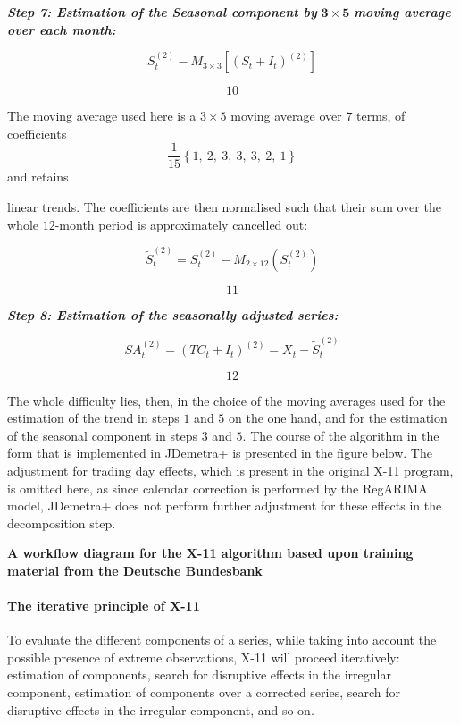 \documentclass[
  letterpaper,
  DIV=11,
  numbers=noendperiod]{scrreprt}
\let\oldparagraph\paragraph
\renewcommand{\paragraph}[1]{\oldparagraph{#1}\mbox{}}
\begin{document}
\textbf{\emph{Step 7: Estimation of the Seasonal component by}}
\(\mathbf{3 \times 5}\) \textbf{\emph{moving average over each month:}}

\[S_{t}^{(2)} - M_{3 \times 3}\left\lbrack \left( S_{t} + I_{t} \right)^{(2)} \right\rbrack\]

\[10\]

The moving average used here is a \(3 \times 5\) moving average over
\(7\) terms, of coefficients
\[\frac{1}{15} \left\{ 1,\ 2,\ 3,\ 3,\ 3,\ 2,\ 1 \right\}\] and retains

linear trends. The coefficients are then normalised such that their sum
over the whole \(12\)-month period is approximately cancelled out:

\[{ \widetilde{S}}_{t}^{(2)} = S_{t}^{(2)} - M_{2 \times 12}\left( S_{t}^{(2)} \right)\]

\[11\]

\textbf{\emph{Step 8: Estimation of the seasonally adjusted series:}}

\[SA_{t}^{\left( 2 \right)} = \left(TC_{t} + I_{t} \right)^{(2)} = X_{t} - {\widetilde{S}}_{t}^{(2)}\]

\[12\]

The whole difficulty lies, then, in the choice of the moving averages
used for the estimation of the trend in steps \(1\) and \(5\) on the one
hand, and for the estimation of the seasonal component in steps \(3\)
and \(5\). The course of the algorithm in the form that is implemented
in JDemetra+ is presented in the figure below. The adjustment for
trading day effects, which is present in the original X-11 program, is
omitted here, as since calendar correction is performed by the RegARIMA
model, JDemetra+ does not perform further adjustment for these effects
in the decomposition step.

\textbf{A workflow diagram for the X-11 algorithm based upon training
material from the Deutsche Bundesbank}

\hypertarget{the-iterative-principle-of-x-11}{%
\paragraph{\texorpdfstring{\textbf{The iterative principle of
X-11}}{The iterative principle of X-11}}\label{the-iterative-principle-of-x-11}}

To evaluate the different components of a series, while taking into
account the possible presence of extreme observations, X-11 will proceed
iteratively: estimation of components, search for disruptive effects in
the irregular component, estimation of components over a corrected
series, search for disruptive effects in the irregular component, and so
on.
\end{document}

